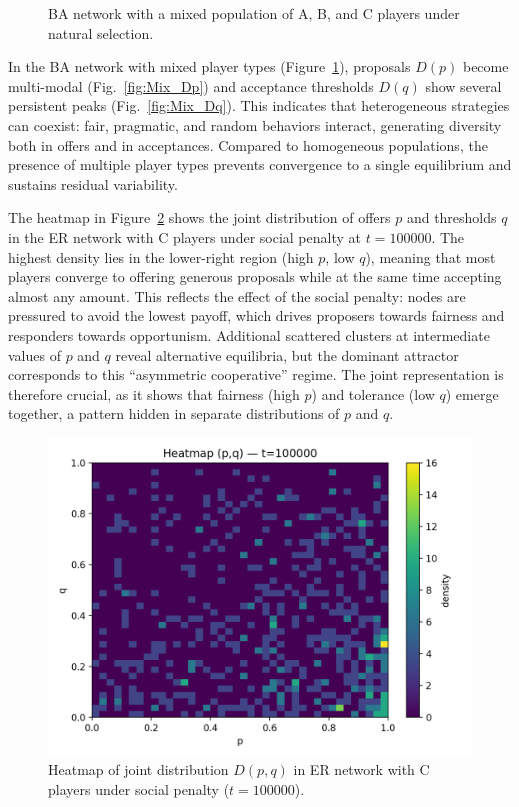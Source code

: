 \begin{figure}[h!]
\begin{minipage}[t]{0.48\textwidth}
        \label{fig:Mix_Dq}
    \end{minipage}
    \caption{BA network with a mixed population of A, B, and C players under natural selection.}
    \label{fig:BA_Mix}
\end{figure}

\noindent In the BA network with mixed player types (Figure~\ref{fig:BA_Mix}), proposals
$D(p)$ become multi-modal (Fig.~\ref{fig:Mix_Dp}) and acceptance thresholds
$D(q)$ show several persistent peaks (Fig.~\ref{fig:Mix_Dq}).  
This indicates that heterogeneous strategies can coexist: fair, pragmatic, and
random behaviors interact, generating diversity both in offers and in
acceptances.  
Compared to homogeneous populations, the presence of multiple player types
prevents convergence to a single equilibrium and sustains residual variability.



\noindent The heatmap in Figure~\ref{fig:ER_heatmap_pq} shows the joint distribution of
offers $p$ and thresholds $q$ in the ER network with C players under social
penalty at $t=100000$.  
The highest density lies in the lower-right region (high $p$, low $q$), meaning
that most players converge to offering generous proposals while at the same time
accepting almost any amount.  
This reflects the effect of the social penalty: nodes are pressured to avoid the
lowest payoff, which drives proposers towards fairness and responders towards
opportunism.  
Additional scattered clusters at intermediate values of $p$ and $q$ reveal
alternative equilibria, but the dominant attractor corresponds to this
“asymmetric cooperative” regime.  
The joint representation is therefore crucial, as it shows that fairness (high
$p$) and tolerance (low $q$) emerge together, a pattern hidden in separate
distributions of $p$ and $q$.

\begin{figure}[H]
    \centering
    \includegraphics[width=0.75\linewidth]{images/TASK1/heatmap_pq_t100000_ER_C_social_penalty.png}
    \caption{Heatmap of joint distribution $D(p,q)$ in ER network with C players under social penalty ($t=100000$).}
    \label{fig:ER_heatmap_pq}
\end{figure}


